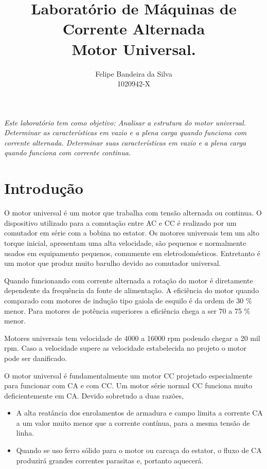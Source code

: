 \documentclass[paper=a4, fontsize=11pt]{article}
\title{Laboratório de Máquinas de Corrente Alternada\\Motor Universal.}
\author{Felipe Bandeira da Silva\\1020942-X}
\begin{document}
\maketitle


\textit{Este laboratório tem como objetivo: Analisar a estrutura do motor universal. Determinar as características em vazio e a plena carga quando funciona com corrente alternada. Determinar suas características em vazio e a plena carga quando funciona com corrente continua.}

\newpage

\tableofcontents

\newpage



\newpage
\section{Introdução}

O motor universal é um motor que trabalha com tensão alternada ou 
continua. O dispositivo utilizado para a comutação entre AC e CC é 
realizado por um comutador em série com a bobina no estator.
Os motores universais tem um alto torque inicial, apresentam 
uma alta velocidade, são pequenos e normalmente usados em 
equipamento pequenos, comumente em eletrodomésticos. Entretanto é um 
motor que produz muito barulho devido ao comutador universal.

Quando funcionando com corrente alternada a rotação do motor é 
diretamente dependente da frequência da fonte de alimentação. A
eficiência do motor quando comparado com motores de indução tipo 
gaiola de esquilo é da ordem de 30 $\%$ menor. Para motores de 
potência superiores a eficiência chega a ser 70 a 75 $\%$ menor.

Motores universais tem velocidade de 4000 a 16000 rpm podendo 
chegar a 20 mil rpm. Caso a velocidade supere as velocidade 
estabelecida no projeto o motor pode ser danificado.

O motor universal é fundamentalmente um motor CC projetado especialmente
para funcionar com CA e com CC. Um motor série normal CC funciona 
muito deficientemente em CA. Devido sobretudo a duas razões,

\begin{itemize}
        \item A alta reatância dos enrolamentos de armadura e campo
                limita a corrente CA a um valor muito menor que a corrente
                contínua, para a mesma tensão de linha.
        \item Quando se uso ferro sólido para o motor ou carcaça do estator, 
                o fluxo de CA produzirá grandes correntes parasitas e, 
                portanto aquecerá.
\end{itemize}
\end{document}
